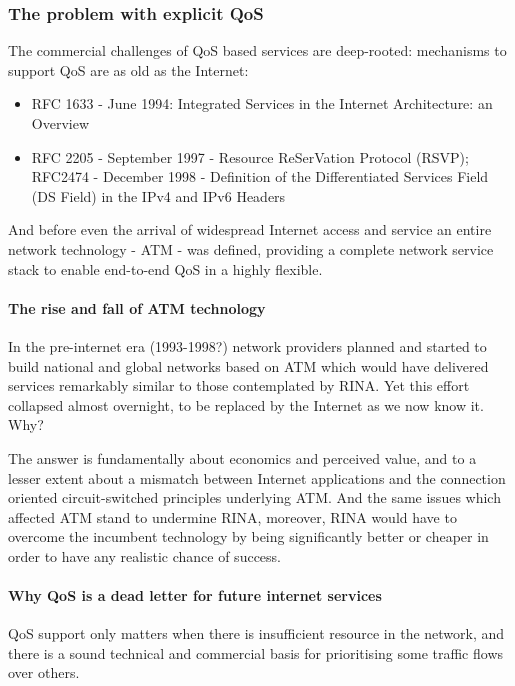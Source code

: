 \subsubsection{The problem with explicit QoS}
\label{sec:The problem with explicit QoS}
The commercial challenges of QoS based services are deep-rooted: mechanisms to support QoS are as old as the Internet:

\begin{itemize}
    \item RFC 1633 - June 1994: Integrated Services in the Internet Architecture: an Overview
    \item RFC 2205 - September 1997 - Resource ReSerVation Protocol (RSVP); RFC2474 - December 1998 - Definition of the Differentiated Services Field (DS Field) in the IPv4 and IPv6 Headers
\end{itemize}
And before even the arrival of widespread Internet access and service an entire network technology - ATM - was defined, providing a complete network service stack to enable end-to-end QoS in a highly flexible.

\paragraph{The rise and fall of ATM technology}

In the pre-internet era (1993-1998?) network providers planned and started to build national and global networks based on ATM which would have delivered services remarkably similar to those contemplated by RINA.
Yet this effort collapsed almost overnight, to be replaced by the Internet as we now know it.
Why?

The answer is fundamentally about economics and perceived value, and to a lesser extent about a mismatch between Internet applications and the connection oriented circuit-switched principles underlying ATM.
And the same issues which affected ATM stand to undermine RINA, moreover, RINA would have to overcome the incumbent technology by being significantly better or cheaper in order to have any realistic chance of success.


\paragraph{Why QoS is a dead letter for future internet services}

QoS support only matters when there is insufficient resource in the network, and there is a sound technical and commercial basis for prioritising some traffic flows over others.

